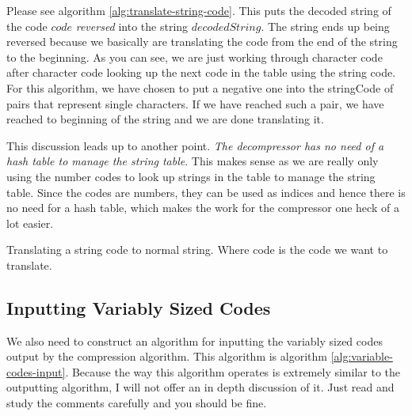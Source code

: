 Please see algorithm \ref{alg:translate-string-code}. This puts the
decoded string of the code $code$ \textit{reversed} into the string
$decodedString$. The string ends up being reversed because we
basically are translating the code from the end of the string to the
beginning. As you can see, we are just working through character code
after character code looking up the next code in the table using the
string code. For this algorithm, we have chosen to put a negative one
into the stringCode of pairs that represent single characters. If we
have reached such a pair, we have reached to beginning of the string
and we are done translating it.

This discussion leads up to another point. \textit{The decompressor
  has no need of a hash table to manage the string table}. This makes sense as
we are really only using the number codes to look up strings in the
table to manage the string table. Since the codes are numbers, they
can be used as indices and hence there is no need for a hash table,
which makes the work for the compressor one heck of a lot easier.

\begin{algorithm}[H]
  \caption{Translating a string code to normal string. Where code is
    the code we want to translate. }
  \label{alg:translate-string-code}
  \begin{algorithmic}[1]
    \While{\True}
        \Break
      \Else
      \EndIf
    \EndWhile
  \end{algorithmic}
\end{algorithm}

\subsection{Inputting Variably Sized Codes}

We also need to construct an algorithm for inputting the variably
sized codes output by the compression algorithm. This algorithm is
algorithm \ref{alg:variable-codes-input}. Because the way this algorithm operates is extremely
similar to the outputting algorithm, I will not offer an in depth
discussion of it. Just read and study the comments carefully and you
should be fine.

